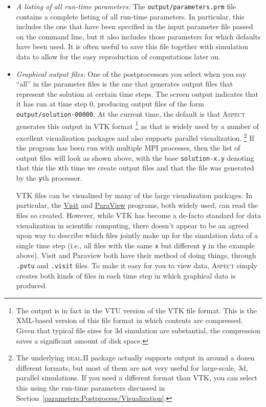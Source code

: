 \documentclass{article}
\newcommand{\dealii}{{\textsc{deal.II}}}
\newcommand{\aspect}{\textsc{Aspect}}
\begin{document}
\begin{itemize}
\item \textit{A listing of all run-time parameters:} The
  \texttt{output/parameters.prm} file contains a complete listing of all
  run-time parameters. In particular, this includes the one that have been
  specified in the input parameter file passed on the command line, but it
  also includes those parameters for which defaults have been used. It is
  often useful to save this file together with simulation data to allow for
  the easy reproduction of computations later on.

\item \textit{Graphical output files:} One of the postprocessors you select
  when you say ``all'' in the parameter files is the one that generates output
  files that represent the solution at certain time steps. The screen output
  indicates that it has run at time step 0, producing output files of the form
  \texttt{output/solution-00000}. At the current time, the default is that \aspect{} generates
  this output in VTK format%
  \footnote{The output is in fact in the VTU version of the VTK file
    format. This is the XML-based version of this file format in which
    contents are compressed. Given that typical file sizes for 3d simulation
    are substantial, the compression saves a significant amount of disk
    space.}  as that is widely used by a number of excellent visualization
  packages and also supports parallel visualization.%
  \footnote{The underlying \dealii{} package actually supports output in
    around a dozen different formats, but most of them are not very useful for
    large-scale, 3d, parallel simulations. If you need a different format than
    VTK, you can select this using the run-time parameters discussed in
    Section~\ref{parameters:Postprocess/Visualization}.}  If
  the program has been run with multiple MPI processes, then the list of
  output files will look as shown above, with the base \texttt{solution-x.y}
  denoting that this the \texttt{x}th time we create output files and that the
  file was generated by the \texttt{y}th processor.

  VTK files can be visualized by many of the large visualization packages. In
  particular, the
  \href{http://www.llnl.gov/visit/}{Visit} and
  \href{http://www.paraview.org/HTML/Index.html}{ParaView} programs, both
  widely used, can read the files so created. However, while VTK has become a
  de-facto standard for data visualization in scientific computing, there
  doesn't appear to be an agreed upon way to describe which files jointly make
  up for the simulation data of a single time step (i.e., all files with the
  same \texttt{x} but different \texttt{y} in the example above). Visit and
  Paraview both have their method of doing things, through \texttt{.pvtu} and
  \texttt{.visit} files. To make it easy for you to view data, \aspect{}
  simply creates both kinds of files in each time step in which graphical data
  is produced.


\end{itemize}
\end{document}
